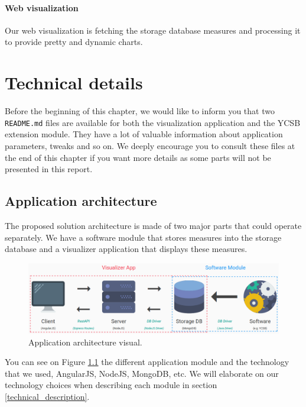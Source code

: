 \documentclass[a4paper,11pt]{report}
\begin{document}
\subsubsection{Web visualization}

Our web visualization is fetching the storage database measures and processing it to provide pretty and dynamic charts.

\clearpage

\chapter{Technical details}\label{techical_chapter}

Before the beginning of this chapter, we would like to inform you that two \texttt{README.md} files are available for both the visualization application and the YCSB extension module. They have a lot of valuable information about application parameters, tweaks and so on. We deeply encourage you to consult these files at the end of this chapter if you want more details as some parts will not be presented in this report.

\section{Application architecture}\label{app_archi_section}

The proposed solution architecture is made of two major parts that could operate separately. We have a software module that stores measures into the storage database and a visualizer application that displays these measures.

\begin{figure}[ht]
\begin{center}
\includegraphics[width=1\linewidth]{images/archi_small_complete.png}
\caption{Application architecture visual.}
\label{app_archi_fig}
\end{center}
\end{figure}

You can see on Figure \ref{app_archi_fig} the different application module and the technology that we used, AngularJS, NodeJS, MongoDB, etc. We will elaborate on our technology choices when describing each module in section \ref{technical_description}. 
\end{document}
